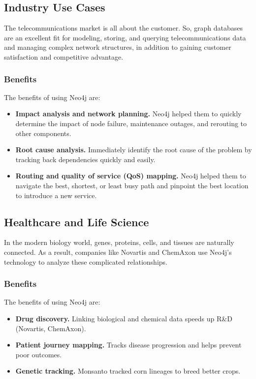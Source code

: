 \documentclass[10pt,a4paper,twocolumn]{article}
\begin{document}
\subsection{Industry Use Cases}

The telecommunications market is all about the customer. So, graph databases are an excellent fit for modeling, storing, and querying telecommunications data and managing complex network structures, in addition to gaining customer satisfaction and competitive advantage.

\subsubsection*{Benefits}

The benefits of using Neo4j are:

\begin{itemize}
  \item \textbf{Impact analysis and network planning.} Neo4j helped them to quickly determine the impact of node failure, maintenance outages, and rerouting to other components.
  \item \textbf{Root cause analysis.} Immediately identify the root cause of the problem by tracking back dependencies quickly and easily.
  \item \textbf{Routing and quality of service (QoS) mapping.} Neo4j helped them to navigate the best, shortest, or least busy path and pinpoint the best location to introduce a new service.
\end{itemize}

\subsection{Healthcare and Life Science}

In the modern biology world, genes, proteins, cells, and tissues are naturally connected. As a result, companies like Novartis and ChemAxon use Neo4j's technology to analyze these complicated relationships.

\subsubsection*{Benefits}

The benefits of using Neo4j are:

\begin{itemize}
  \item \textbf{Drug discovery.} Linking biological and chemical data speeds up R\&D (Novartis, ChemAxon).
  \item \textbf{Patient journey mapping.} Tracks disease progression and helps prevent poor outcomes.
  \item \textbf{Genetic tracking.} Monsanto tracked corn lineages to breed better crops.
\end{itemize}
\end{document}
